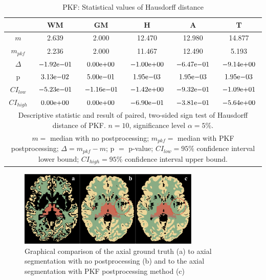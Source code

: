 \documentclass[journal]{IEEEtran}
\begin{document}
\begin{table}[ht]

\renewcommand{\arraystretch}{1.3}
\caption{PKF: Statistical values of Hausdorff distance}
\label{tbl_pkf_hd}
\centering
\tabcolsep=0.06cm
\begin{tabular}{c|c|c|c|c|c}
\hline
 & WM & GM & H & A & T\\
\hline
$m$ &2.639&2.000&12.470&12.980&14.877\\
$m_{pkf}$&2.236&2.000&11.467&12.490&5.193\\
$\Delta$&${-1.92}\mathrm{e}{-01}$&${0.00}\mathrm{e}{+00}$&${-1.00}\mathrm{e}{+00}$&${-6.47}\mathrm{e}{-01}$&${-9.14}\mathrm{e}{+00}$\\
p&${3.13}\mathrm{e}{-02}$&${5.00}\mathrm{e}{-01}$&${1.95}\mathrm{e}{-03}$&${1.95}\mathrm{e}{-03}$&${1.95}\mathrm{e}{-03}$\\
$CI_{low}$&${-5.23}\mathrm{e}{-01}$&${-1.16}\mathrm{e}{-01}$&${-1.42}\mathrm{e}{+00}$&${-9.32}\mathrm{e}{-01}$&${-1.09}\mathrm{e}{+01}$\\
$CI_{high}$&${0.00}\mathrm{e}{+00}$&${0.00}\mathrm{e}{+00}$&${-6.90}\mathrm{e}{-01}$&${-3.81}\mathrm{e}{-01}$&${-5.64}\mathrm{e}{+00}$\\
\hline
\multicolumn{6}{p{3.4in}}{Descriptive statistic and result of paired, two-sided sign test of Hausdorff distance of PKF. $n=10$, significance level $\alpha = 5\%$.}\\
\multicolumn{6}{p{3.4in}}{$m=$ median with no postprocessing; $m_{pkf}=$ median with PKF postprocessing; $\Delta=m_{pkf}-m$; p $=$ p-value;  $CI_{low}= 95\%$ confidence interval lower bound; $CI_{high}= 95\%$ confidence interval upper bound.}\\

\end{tabular}

\end{table}

\begin{figure}[h!]
\centering
\includegraphics[width=3.4in]{img/boxplots/PKF.png}
\caption{Graphical comparison of the axial ground truth (a) to axial segmentation with no postprocessing (b) and to the axial segmentation with PKF postprocessing method (c) }
\label{fig_pkf}
\end{figure}
\end{document}
